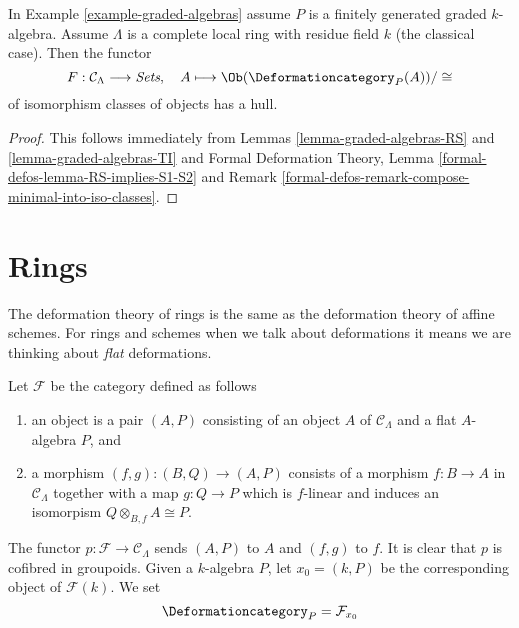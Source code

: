\begin{lemma}
\label{lemma-graded-algebras-hull}
In Example \ref{example-graded-algebras} assume $P$ is a finitely generated
graded $k$-algebra. Assume $\Lambda$ is a complete local ring with residue field $k$
(the classical case). Then the functor
$$
F : \mathcal{C}_\Lambda \longrightarrow \textit{Sets},\quad
A \longmapsto \Ob(\Deformationcategory_P(A))/\cong
$$
of isomorphism classes of objects has a hull.
\end{lemma}

\begin{proof}
This follows immediately from Lemmas \ref{lemma-graded-algebras-RS} and
\ref{lemma-graded-algebras-TI} and
Formal Deformation Theory, Lemma \ref{formal-defos-lemma-RS-implies-S1-S2}
and Remark \ref{formal-defos-remark-compose-minimal-into-iso-classes}.
\end{proof}







\section{Rings}
\label{section-rings}

\noindent
The deformation theory of rings is the same as the deformation theory
of affine schemes. For rings and schemes when we talk about deformations
it means we are thinking about {\it flat} deformations.

\begin{example}[Rings]
\label{example-rings}
Let $\mathcal{F}$ be the category defined as follows
\begin{enumerate}
\item an object is a pair $(A, P)$ consisting of an
object $A$ of $\mathcal{C}_\Lambda$ and a flat $A$-algebra $P$, and
\item a morphism $(f, g) : (B, Q) \to (A, P)$ consists of
a morphism $f : B \to A$ in $\mathcal{C}_\Lambda$ together
with a map $g : Q \to P$ which is $f$-linear and induces an
isomorpism $Q \otimes_{B, f} A \cong P$.
\end{enumerate}
The functor $p : \mathcal{F} \to \mathcal{C}_\Lambda$ sends $(A, P)$
to $A$ and $(f, g)$ to $f$. It is clear that $p$ is cofibred in groupoids.
Given a $k$-algebra $P$, let $x_0 = (k, P)$ be the corresponding object
of $\mathcal{F}(k)$. We set
$$
\Deformationcategory_P = \mathcal{F}_{x_0}
$$
\end{example}

